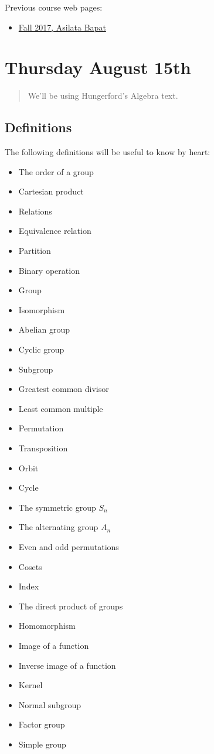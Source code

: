 Previous course web pages:

\begin{itemize}
\tightlist
\item
  \href{https://asilata.github.io/8000fall17/}{Fall 2017, Asilata Bapat}
\end{itemize}

\hypertarget{thursday-august-15th}{%
\section{Thursday August 15th}\label{thursday-august-15th}}

\begin{quote}
We'll be using Hungerford's Algebra text.
\end{quote}

\hypertarget{definitions}{%
\subsection{Definitions}\label{definitions}}

The following definitions will be useful to know by heart:

\begin{itemize}
\tightlist
\item
  The order of a group
\item
  Cartesian product
\item
  Relations
\item
  Equivalence relation
\item
  Partition
\item
  Binary operation
\item
  Group
\item
  Isomorphism
\item
  Abelian group
\item
  Cyclic group
\item
  Subgroup
\item
  Greatest common divisor
\item
  Least common multiple
\item
  Permutation
\item
  Transposition
\item
  Orbit
\item
  Cycle
\item
  The symmetric group \(S_{n}\)
\item
  The alternating group \(A_{n}\)
\item
  Even and odd permutations
\item
  Cosets
\item
  Index
\item
  The direct product of groups
\item
  Homomorphism
\item
  Image of a function
\item
  Inverse image of a function
\item
  Kernel
\item
  Normal subgroup
\item
  Factor group
\item
  Simple group
\end{itemize}

